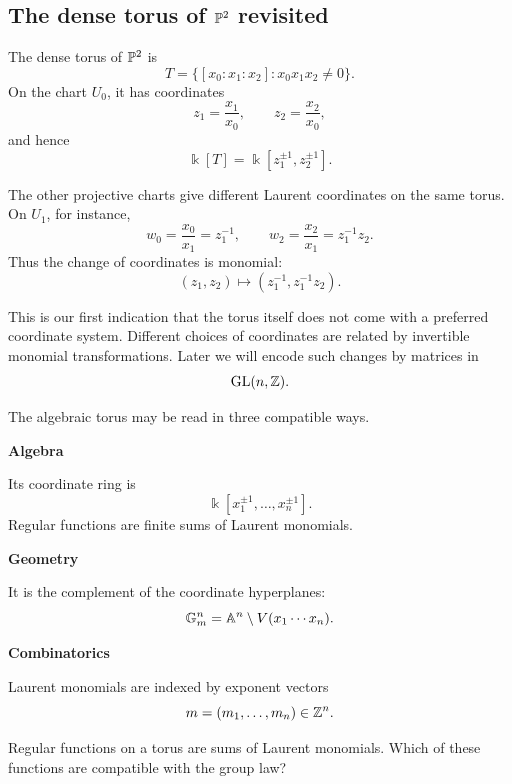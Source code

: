 \subsection{The dense torus of \texorpdfstring{\(\mathbb{P}^2\)}{P2} revisited}

The dense torus of \(\mathbb{P}^2\) is
\[
T
=
\{[x_0:x_1:x_2]:x_0x_1x_2\neq0\}.
\]
On the chart \(U_0\), it has coordinates
\[
z_1=\frac{x_1}{x_0},
\qquad
z_2=\frac{x_2}{x_0},
\]
and hence
\[
\Bbbk[T]
=
\Bbbk[z_1^{\pm1},z_2^{\pm1}].
\]

The other projective charts give different Laurent coordinates on the
same torus. On \(U_1\), for instance,
\[
w_0=\frac{x_0}{x_1}=z_1^{-1},
\qquad
w_2=\frac{x_2}{x_1}=z_1^{-1}z_2.
\]
Thus the change of coordinates is monomial:
\[
(z_1,z_2)
\longmapsto
(z_1^{-1},z_1^{-1}z_2).
\]

This is our first indication that the torus itself does not come with a
preferred coordinate system. Different choices of coordinates are
related by invertible monomial transformations. Later we will encode
such changes by matrices in
\[
\operatorname{GL}(n,\mathbb{Z}).
\]

\begin{threedictionaries}
The algebraic torus may be read in three compatible ways.

\medskip

\noindent
\begin{minipage}[t]{0.30\linewidth}
\centering
\textbf{Algebra}\par
\smallskip
Its coordinate ring is
\[
\Bbbk[x_1^{\pm1},\ldots,x_n^{\pm1}].
\]
Regular functions are finite sums of Laurent monomials.
\end{minipage}
\hfill
\begin{minipage}[t]{0.30\linewidth}
\centering
\textbf{Geometry}\par
\smallskip
It is the complement of the coordinate hyperplanes:
\[
\mathbb{G}_{m}^n
=
\mathbb{A}^n\setminus V(x_1\cdots x_n).
\]
\end{minipage}
\hfill
\begin{minipage}[t]{0.30\linewidth}
\centering
\textbf{Combinatorics}\par
\smallskip
Laurent monomials are indexed by exponent vectors
\[
m=(m_1,\ldots,m_n)\in\mathbb{Z}^n.
\]
\end{minipage}
\end{threedictionaries}

\begin{guidingquestion}
Regular functions on a torus are sums of Laurent monomials. Which of
these functions are compatible with the group law?
\end{guidingquestion}


